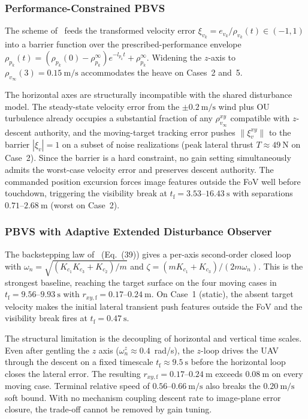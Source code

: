 \documentclass[10pt,journal]{IEEEtran}
\begin{document}
\subsubsection{Performance-Constrained PBVS \cite{lin2022}}

The scheme of~\cite{lin2022} feeds the transformed velocity error $\xi_{v_k}=e_{v_k}/\rho_{v_k}(t)\in(-1,1)$ into a barrier function over the prescribed-performance envelope $\rho_{p_k}(t)=(\rho_{p_k}(0)-\rho_{p_k}^\infty)e^{-l_{p_k}t}+\rho_{p_k}^\infty$. Widening the $z$-axis to $\rho_{v_\infty}(3)=0.15~\text{m/s}$ accommodates the heave on Cases~2 and~5.

The horizontal axes are structurally incompatible with the shared disturbance model. The steady-state velocity error from the $\pm 0.2~\text{m/s}$ wind plus OU turbulence already occupies a substantial fraction of any $\rho_{v_\infty}^{xy}$ compatible with $z$-descent authority, and the moving-target tracking error pushes $\|\xi_v^{xy}\|$ to the barrier $|\xi_v|=1$ on a subset of noise realizations (peak lateral thrust $T\approx 49~\text{N}$ on Case~2). Since the barrier is a hard constraint, no gain setting simultaneously admits the worst-case velocity error and preserves descent authority. The commanded position excursion forces image features outside the FoV well before touchdown, triggering the visibility break at $t_\text{f}=3.53$--$16.43~\text{s}$ with separations $0.71$--$2.68~\text{m}$ (worst on Case~2).

\subsubsection{PBVS with Adaptive Extended Disturbance Observer \cite{zhang2026}}

The backstepping law of~\cite{zhang2026} (Eq.~(39)) gives a per-axis second-order closed loop with $\omega_n=\sqrt{(K_{c_1}K_{c_3}+K_{c_2})/m}$ and $\zeta=(mK_{c_1}+K_{c_3})/(2m\omega_n)$. This is the strongest baseline, reaching the target surface on the four moving cases in $t_\text{f}=9.56$--$9.93~\text{s}$ with $r_{xy,\text{f}}=0.17$--$0.24~\text{m}$. On Case~1 (static), the absent target velocity makes the initial lateral transient push features outside the FoV and the visibility break fires at $t_\text{f}=0.47~\text{s}$.

The structural limitation is the decoupling of horizontal and vertical time scales. Even after gentling the $z$ axis ($\omega_n^z\approx 0.4$~rad/s), the $z$-loop drives the UAV through the descent on a fixed timescale $t_\text{f}\approx 9.5~\text{s}$ before the horizontal loop closes the lateral error. The resulting $r_{xy,\text{f}}=0.17$--$0.24~\text{m}$ exceeds $0.08~\text{m}$ on every moving case. Terminal relative speed of $0.56$--$0.66~\text{m/s}$ also breaks the $0.20~\text{m/s}$ soft bound. With no mechanism coupling descent rate to image-plane error closure, the trade-off cannot be removed by gain tuning.
\end{document}
